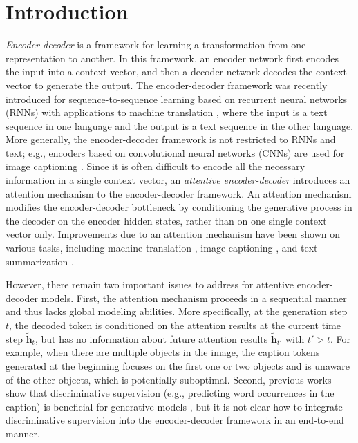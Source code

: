 \documentclass{article}
\begin{document}
\section{Introduction}\textit{Encoder-decoder} is a framework for learning a transformation from one representation to another. In this framework, an encoder network first encodes the input into a context vector, and then a decoder network decodes the context vector to generate the output. The encoder-decoder framework was recently introduced for sequence-to-sequence learning based on recurrent neural networks (RNNs) with applications to machine translation \cite{cho2014learning,sutskever2014sequence}, where the input is a text sequence in one language and the output is a text sequence in the other language. More generally, the encoder-decoder framework is not restricted to RNNs and text; e.g., encoders based on convolutional neural networks (CNNs) are used for image captioning \cite{vinyals2015show}.
Since it is often difficult to encode all the necessary information in a single context vector, an \textit{attentive encoder-decoder} introduces an attention mechanism to the encoder-decoder framework. An attention mechanism modifies the encoder-decoder bottleneck by conditioning the generative process in the decoder on the encoder hidden states, rather than on one single context vector only.
Improvements due to an attention mechanism have been shown on various tasks, including machine translation \cite{bahdanau2014neural}, image captioning \cite{xu2015show}, and text summarization \cite{rush2015neural}.

However, there remain two important issues to address for attentive encoder-decoder models. First, the attention mechanism proceeds in a sequential manner and thus lacks global modeling abilities. More specifically, at the generation step $t$, the decoded token is conditioned on the attention results at the current time step $\tilde{\mathbf{h}}_t$, but has no information about future attention results $\tilde{\mathbf{h}}_{t'}$ with $t' > t$. For example, when there are multiple objects in the image, the caption tokens generated at the beginning focuses on the first one or two objects and is unaware of the other objects, which is potentially suboptimal. Second, previous works show that discriminative supervision (e.g., predicting word occurrences in the caption) is beneficial for generative models \cite{fang2015captions}, but it is not clear how to integrate discriminative supervision into the encoder-decoder framework in an end-to-end manner.
\end{document}
